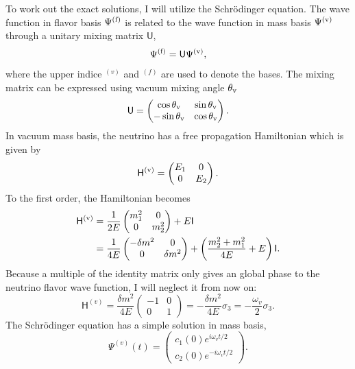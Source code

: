 To work out the exact solutions, I will utilize the Schr\"{o}dinger equation. The wave function in flavor basis $\Psi^{(\mathrm f)}$ is related to the wave function in mass basis $\Psi^{(\mathrm v)}$ through a unitary mixing matrix $\mathsf U$,
\begin{equation}
\Psi^{(\mathrm f)} = \mathsf{U}\Psi^{(\vv)},
\label{chap:vacuum-eqn:wavefunction}
\end{equation}
where the upper indice ${}^{(v)}$ and ${}^{(f)}$ are used to denote the bases. The mixing matrix can be expressed using vacuum mixing angle $\theta_{\mathrm v}$
\begin{equation}
\mathsf{U} = \begin{pmatrix} \cos\theta_\mathrm v & \sin \theta_\mathrm v \\ -\sin \theta_\mathrm v & \cos \theta_\mathrm v \end{pmatrix}.
\end{equation}
In vacuum mass basis, the neutrino has a free propagation Hamiltonian which is given by
\begin{equation}
\mathsf H^{(\mathrm v)} = \begin{pmatrix} E_1 & 0 \\
0 & E_2
\end{pmatrix}.
\end{equation}
To the first order, the Hamiltonian becomes
\begin{align}
\mathsf H^{(\mathrm v)} &= \frac{1}{2E} \begin{pmatrix}
m_1^2 & 0 \\
0 & m_2^2
\end{pmatrix} + E \mathsf{I} \nonumber \\
& =  \frac{1}{4E} \begin{pmatrix}
 - \delta m^2 & 0 \\
0 & \delta m^2
\end{pmatrix}  + \left(\frac{m_2^2 + m_1^2}{4E}  + E \right) \mathsf{I}.
\end{align}
Because a multiple of the identity matrix only gives an global phase to the neutrino flavor wave function, I will neglect it from now on:
\begin{equation}
\mathsf H^{(v)} =  \frac{\delta m^2}{4E} \begin{pmatrix}
-1 & 0 \\
0 & 1
\end{pmatrix} = -\frac{\delta m^2}{4E} \sigma_3 = -\frac{\omega_{v}}{2}\sigma_3.
\end{equation}
The Schr\"{o}dinger equation has a simple solution in mass basis,
\begin{equation}
\Psi^{(v)}(t) = \begin{pmatrix}
c_1(0) e^{i \omega_v t/2 } \\
c_2(0) e^{ -i\omega_v t/2 }
\end{pmatrix}.
\end{equation}
